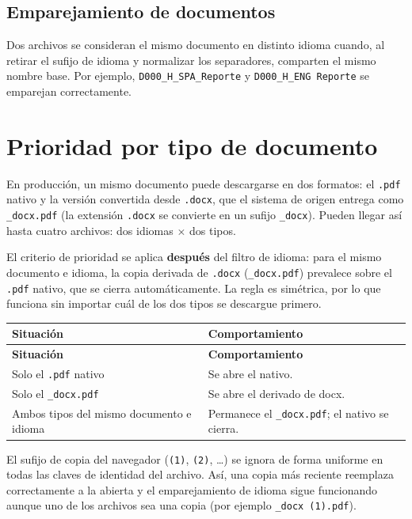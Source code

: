 \documentclass[11pt,a4paper]{article}
\begin{document}
\subsection{Emparejamiento de documentos}
Dos archivos se consideran el mismo documento en distinto idioma cuando, al
retirar el sufijo de idioma y normalizar los separadores, comparten el mismo
nombre base. Por ejemplo, \texttt{D000\_H\_SPA\_Reporte} y
\texttt{D000\_H\_ENG Reporte} se emparejan correctamente.

\section{Prioridad por tipo de documento}
En producción, un mismo documento puede descargarse en dos formatos: el
\texttt{.pdf} nativo y la versión convertida desde \texttt{.docx}, que el sistema
de origen entrega como \texttt{\_docx.pdf} (la extensión \texttt{.docx} se
convierte en un sufijo \texttt{\_docx}). Pueden llegar así hasta cuatro archivos:
dos idiomas $\times$ dos tipos.

El criterio de prioridad se aplica \textbf{después} del filtro de idioma: para el
mismo documento e idioma, la copia derivada de \texttt{.docx} (\texttt{\_docx.pdf})
prevalece sobre el \texttt{.pdf} nativo, que se cierra automáticamente. La regla es
simétrica, por lo que funciona sin importar cuál de los dos tipos se descargue
primero.

\begin{xltabular}{\textwidth}{@{} L L @{}}
\toprule
\textbf{Situación} & \textbf{Comportamiento} \\
\midrule
\endfirsthead
\toprule
\textbf{Situación} & \textbf{Comportamiento} \\
\midrule
\endhead
\bottomrule
\endfoot
Solo el \texttt{.pdf} nativo & Se abre el nativo. \\
Solo el \texttt{\_docx.pdf} & Se abre el derivado de docx. \\
Ambos tipos del mismo documento e idioma & Permanece el \texttt{\_docx.pdf}; el nativo se cierra. \\
\bottomrule
\end{xltabular}

El sufijo de copia del navegador (\texttt{(1)}, \texttt{(2)}, \ldots) se ignora de
forma uniforme en todas las claves de identidad del archivo. Así, una copia más
reciente reemplaza correctamente a la abierta y el emparejamiento de idioma sigue
funcionando aunque uno de los archivos sea una copia (por ejemplo
\texttt{\_docx (1).pdf}).
\end{document}
